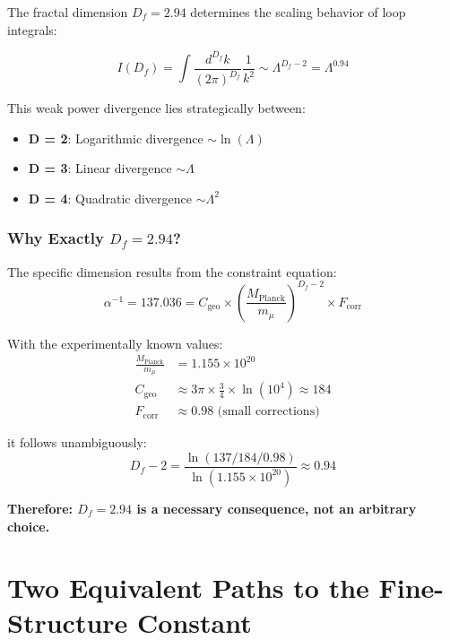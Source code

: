 \documentclass[12pt,a4paper]{article}
\theoremstyle{definition}
\begin{document}
	The fractal dimension $D_f = 2.94$ determines the scaling behavior of loop integrals:
	
	\begin{equation}
		I(D_f) = \int \frac{d^{D_f} k}{(2\pi)^{D_f}} \frac{1}{k^2} \sim \Lambda^{D_f-2} = \Lambda^{0.94}
	\end{equation}
	
	This weak power divergence lies strategically between:
	\begin{itemize}
		\item \textbf{D = 2}: Logarithmic divergence $\sim \ln(\Lambda)$
		\item \textbf{D = 3}: Linear divergence $\sim \Lambda$
		\item \textbf{D = 4}: Quadratic divergence $\sim \Lambda^2$
	\end{itemize}
	
	\subsubsection{Why Exactly $D_f = 2.94$?}
	
	The specific dimension results from the constraint equation:
	\begin{equation}
		\alpha^{-1} = 137.036 = C_{\text{geo}} \times \left(\frac{M_{\text{Planck}}}{m_\mu}\right)^{D_f-2} \times F_{\text{corr}}
	\end{equation}
	
	With the experimentally known values:
	\begin{align}
		\frac{M_{\text{Planck}}}{m_\mu} &= 1.155 \times 10^{20} \\
		C_{\text{geo}} &\approx 3\pi \times \frac{3}{4} \times \ln(10^4) \approx 184 \\
		F_{\text{corr}} &\approx 0.98 \text{ (small corrections)}
	\end{align}
	
	it follows unambiguously:
	\begin{equation}
		D_f - 2 = \frac{\ln(137/184/0.98)}{\ln(1.155 \times 10^{20})} \approx 0.94
	\end{equation}
	
	\textbf{Therefore: $D_f = 2.94$ is a necessary consequence, not an arbitrary choice.}
	
	\section{Two Equivalent Paths to the Fine-Structure Constant}
	
\end{document}
